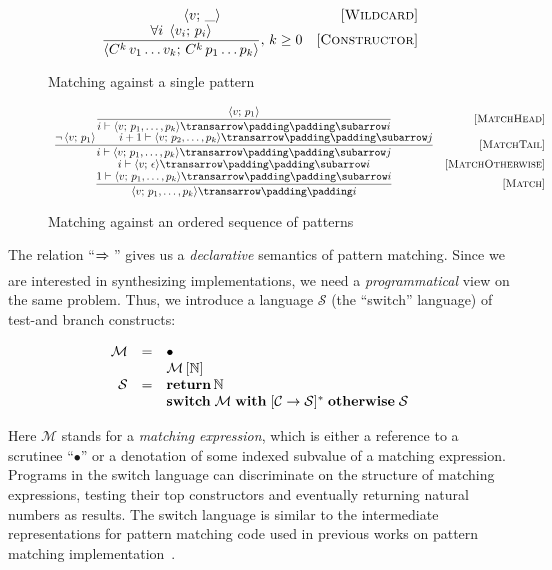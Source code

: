 \begin{figure}
   \renewcommand*{\arraystretch}{2}
   \[
   \begin{array}{cr}
     \left<{v;\,\_}\right> & \mbox{[\textsc{Wildcard}]} \\
     \dfrac{\forall i\;\left<{v_i;\,p_i}\right>}{\left<{C^k\,v_1\dots v_k;\,C^k\,p_1\dots p_k}\right>},\,k\ge 0 & \mbox{[\textsc{Constructor}]}
   \end{array}
   \]
   \caption{Matching against a single pattern}
   \label{fig:match1pat}
\end{figure}

\begin{figure}
   \renewcommand*{\arraystretch}{3}
   \setarrow{\xRightarrow}
   \setsubarrow{_*}
   \[
   \begin{array}{cr}
     \trule{\inbr{v;\,p_1}}
           {\withenv{i}{\trans{\inbr{v;\,p_1,\dots,p_k}}{}{i}}} & \ruleno{MatchHead}\\
     \trule{\neg\inbr{v;\,p_1}\qquad\withenv{i+1}{\trans{\inbr{v;\,p_2,\dots,p_k}}{}{j}}}
           {\withenv{i}{\trans{\inbr{v;\,p_1,\dots,p_k}}{}{j}}} & \ruleno{MatchTail}\\
     \withenv{i}{\trans{\inbr{v;\,\epsilon}}{}{i}} & \ruleno{MatchOtherwise}\\
     \trule{\withenv{1}{\trans{\inbr{v;\,p_1,\dots,p_k}}{}{i}}}
           {\setsubarrow{}\trans{\inbr{v;\,p_1,\dots,p_k}}{}{i}} & \ruleno{Match}
   \end{array}
   \]
   \caption{Matching against an ordered sequence of patterns}
   \label{fig:matchpatts}
\end{figure}

The relation ``$\xRightarrow{}{}$'' gives us a \emph{declarative} semantics of pattern matching. Since we are interested in
synthesizing implementations, we need a \emph{programmatical} view on the same problem. Thus, we introduce a language $\mathcal S$
(the ``switch'' language) of test-and branch constructs:

\[
\begin{array}{rcl}
  \mathcal M & = & \bullet \\
  &   & \mathcal M\,[\mathbb{N}] \\
  \mathcal{S} & = & \mathbf{return}\,\mathbb{N} \\
  &   & \mathbf{switch}\;\mathcal{M}\;\mathbf{with}\; [\mathcal{C}\; \mathbf{\rightarrow}\; \mathcal{S}]^*\;\mathbf{otherwise}\;\mathcal{S}
\end{array}
\]
 
Here $\mathcal{M}$ stands for a \emph{matching expression}, which is either a reference to a scrutinee ``$\bullet$'' or
a denotation of some indexed subvalue of a matching expression. Programs in the switch language can discriminate on the
structure of matching expressions, testing their top constructors and eventually returning natural numbers as results.
The switch language is similar to the intermediate representations for pattern matching code used in 
previous works on pattern matching implementation~\cite{maranget2001,maranget2008}.

